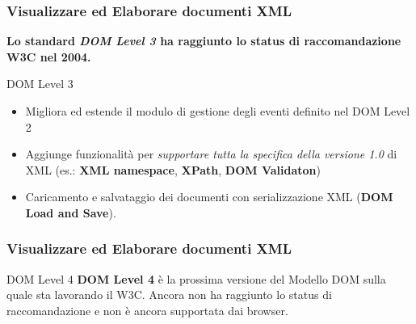 \begin{frame}
    \frametitle{Visualizzare ed Elaborare documenti XML}
    \addtocounter{nframe}{1}
    

     
      \textbf{Lo standard \textit{DOM Level 3} ha raggiunto lo status di raccomandazione W3C nel 2004.}
     

     \begin{block}{DOM Level 3}
        \begin{itemize}
            \item Migliora ed estende il modulo di gestione degli eventi definito nel DOM Level 2
            \item Aggiunge funzionalità per \textit{supportare tutta la specifica della versione 1.0} di XML (es.: \textbf{XML namespace}, \textbf{XPath}, \textbf{DOM Validaton})
            \item Caricamento e salvataggio dei documenti con serializzazione XML (\textbf{DOM Load and Save}).
        \end{itemize}
       
      \end{block}

\end{frame}


\begin{frame}
    \frametitle{Visualizzare ed Elaborare documenti XML}
    \addtocounter{nframe}{1}
    

     \begin{block}{DOM Level 4}
     \textbf{DOM Level 4} è la prossima versione del Modello DOM sulla quale sta lavorando il W3C. Ancora non ha raggiunto lo status di raccomandazione e non è ancora supportata dai browser. 
     \end{block}
     
\end{frame}

